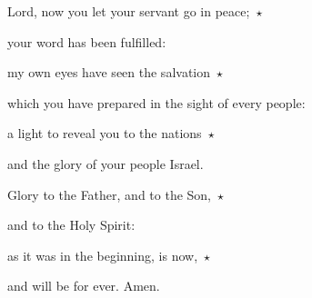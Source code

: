 \lettrine[loversize=0.15,lines=2]{L}{}ord, now you let your servant go in peace;~$\star$~\nopagebreak

\hspace{2pt} your word has been fulfilled:

\noindent my own eyes have seen the salvation~$\star$~\nopagebreak

which you have prepared in the sight of every people:

\noindent a light to reveal you to the nations~$\star$~\nopagebreak

and the glory of your people Israel.

\noindent Glory to the Father, and to the Son,~$\star$~\nopagebreak

and to the Holy Spirit:

\noindent as it was in the beginning, is now,~$\star$~\nopagebreak

and will be for ever. Amen.

